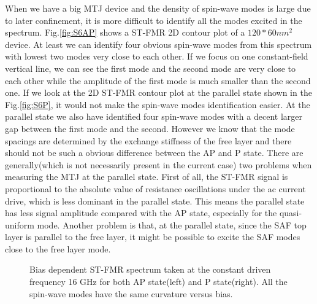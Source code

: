 When we have a big MTJ device and the density of spin-wave modes is large due to later confinement, it is more difficult to identify all the modes excited in the spectrum. Fig.\ref{fig:S6AP} shows a ST-FMR 2D contour plot of a $120*60  nm^2$ device. At least we can identify four obvious spin-wave modes from this spectrum with lowest two modes very close to each other. If we focus on one constant-field vertical line, we can see the first mode and the second mode are very close to each other while the amplitude of the first mode is much smaller than the second one. If we look at the 2D ST-FMR contour plot at the parallel state shown in the Fig.\ref{fig:S6P}, it would not make the spin-wave modes identification easier. At the parallel state we also have identified four spin-wave modes with a decent larger gap between the first mode and the second. However we know that the mode spacings are determined by the exchange stiffness of the free layer and there should not be such a obvious difference between the AP and P state. There are generally(which is not necessarily present in the current case) two problems when measuring the MTJ at the parallel state. First of all, the ST-FMR signal is proportional to the absolute value of resistance oscillations under the ac current drive, which is less dominant in the parallel state. This means the parallel state has less signal amplitude compared with the AP state, especially for the quasi-uniform mode. Another problem is that, at the parallel state, since the SAF top layer is parallel to the free layer, it might be possible to excite the SAF modes close to the free layer mode.


\begin{figure}[!ht]
\centering
{}
\caption{Bias dependent ST-FMR spectrum taken at the constant driven frequency 16 GHz for both AP state(left) and P state(right). All the spin-wave modes have the same curvature versus bias.}
\end{figure}

